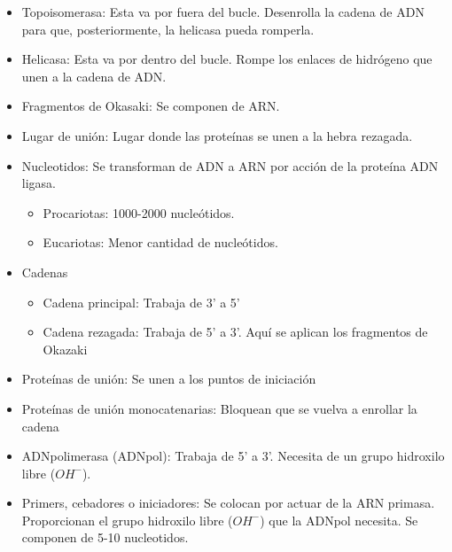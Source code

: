 \begin{itemize}
    \item Topoisomerasa: Esta va  por fuera del bucle. Desenrolla la cadena de ADN para que, posteriormente, la helicasa pueda romperla.
    \item Helicasa: Esta va por dentro del bucle. Rompe los enlaces de hidrógeno que unen a la cadena de ADN.
    \item Fragmentos de Okasaki: Se componen de ARN.
    \item Lugar de unión: Lugar donde las proteínas se unen a la hebra rezagada.
    \item Nucleotidos: Se transforman de ADN a ARN por acción de la proteína ADN ligasa. 
        \begin{itemize}
            \item Procariotas: 1000-2000 nucleótidos.
            \item Eucariotas: Menor cantidad de nucleótidos.
        \end{itemize}
        
    \item Cadenas
        \begin{itemize}
            \item Cadena principal: Trabaja de 3' a 5'
            \item Cadena rezagada: Trabaja de 5' a 3'. Aquí se aplican los fragmentos de Okazaki
        \end{itemize}
    \item Proteínas de unión: Se unen a los puntos de iniciación
    \item Proteínas de unión monocatenarias: Bloquean que se vuelva a enrollar la cadena
    \item ADNpolimerasa (ADNpol): Trabaja de 5' a 3'. Necesita de un grupo hidroxilo libre ($OH^{-}$).
    \item Primers, cebadores o iniciadores: Se colocan por actuar de la ARN primasa. Proporcionan el grupo hidroxilo libre ($OH^{-}$) que la ADNpol necesita. Se componen de 5-10 nucleotidos.
\end{itemize}

%



